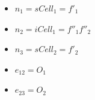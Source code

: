 \begin{minipage}[h]{0.9\linewidth}
\begin{minipage}[h]{0.2\linewidth}
\label{fig_featgraph}
\end{minipage}
\hfill
\begin{minipage}[h]{0.45\linewidth} 
\begin{itemize}[noitemsep,topsep=2pt,parsep=2pt,partopsep=2pt,label={}]
\item $n_1 = sCell_1= f'_1$
\item $n_2 = iCell_1 = f''_1f''_2$
\item $n_3 = sCell_2 = f'_2$
\item $e_{12} = O_1$
\item $e_{23}= O_2$
\end{itemize}
\end{minipage}
\end{minipage}

